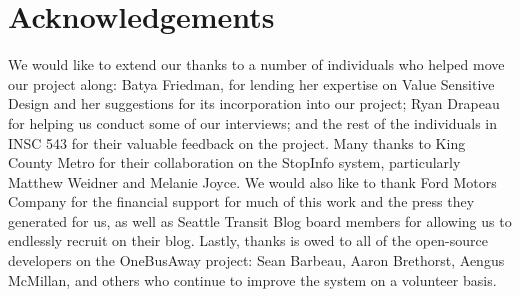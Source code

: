 \section{Acknowledgements}
We would like to extend our thanks to a number of individuals who helped move our project along: Batya Friedman, for lending her expertise on Value Sensitive Design and her suggestions for its incorporation into our project; Ryan Drapeau for helping us conduct some of our interviews; and the rest of the individuals in INSC 543 for their valuable feedback on the project. Many thanks to King County Metro for their collaboration on the StopInfo system, particularly Matthew Weidner and Melanie Joyce. We would also like to thank Ford Motors Company for the financial support for much of this work and the press they generated for us, as well as Seattle Transit Blog board members for allowing us to endlessly recruit on their blog. Lastly, thanks is owed to all of the open-source developers on the OneBusAway project: Sean Barbeau, Aaron Brethorst, Aengus McMillan, and others who continue to improve the system on a volunteer basis. 

